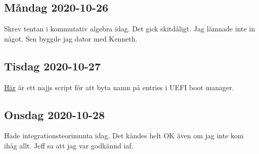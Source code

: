 \subsection{Måndag 2020-10-26}

Skrev tentan i kommutativ algebra idag. Det gick skitdåligt. Jag lämnade inte in något. Sen byggde jag dator med Kenneth.


\subsection{Tisdag 2020-10-27}

\href{https://github.com/s-n-ushakov/rename-efi-entry}{\color{blue}Här} är ett najjs script för att byta namn på entries i UEFI boot manager.

\subsection{Onsdag 2020-10-28}

Hade integrationsteorimunta idag. Det kändes helt OK även om jag inte kom ihåg allt. Jeff sa att jag var godkännd iaf.

